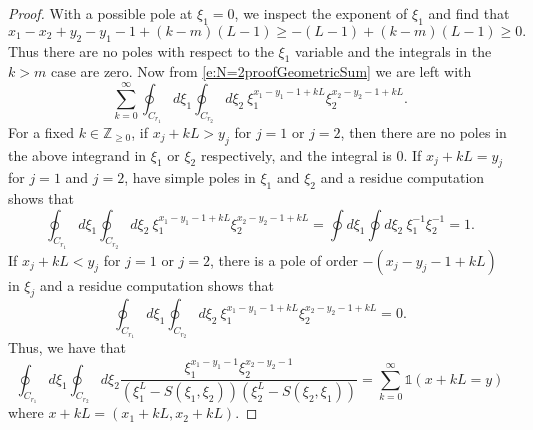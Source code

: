 \documentclass[10pt,a4paper]{amsart}
\begin{document}
\begin{proof}
With a possible pole at $\xi_1=0$, we inspect the exponent of $\xi_1$ and find that 
\begin{equation}
    x_1-x_2+y_2-y_1-1+(k-m)(L-1)\geq -(L-1)+(k-m)(L-1)\geq0.
\end{equation}
Thus there are no poles with respect to the $\xi_1$ variable and the integrals in the $k>m$ case are zero. Now from \eqref{e:N=2proofGeometricSum} we are left with 
\begin{equation}
    \sum_{k=0}^{\infty}\oint_{C_{r_1}} d\xi_1\oint_{C_{r_2}} d\xi_2 \ \xi_1^{x_1-y_1-1+kL}\xi_2^{x_2-y_2-1+kL}.
\end{equation}
For a fixed $k\in\mathbb{Z}_{\geq 0}$, if $x_j+kL>y_j$ for $j=1$ or $j=2$, then there are no poles in the above integrand in $\xi_1$ or $\xi_2$ respectively, and the integral is $0$. If $x_j+kL = y_j$ for $j=1$ and $j=2$, have simple poles in $\xi_1$ and $\xi_2$ and a residue computation shows that
\begin{equation}
    \oint_{C_{r_1}} d\xi_1\oint_{C_{r_2}} d\xi_2 \ \xi_1^{x_1-y_1-1+kL}\xi_2^{x_2-y_2-1+kL} = \oint d\xi_1\oint d\xi_2 \ \xi_1^{-1}\xi_2^{-1} =1.
\end{equation}
If $x_j+kL<y_j$ for $j=1$ or $j=2$, there is a pole of order $-(x_j-y_j-1+kL)$ in $\xi_j$ and a residue computation shows that
\begin{equation}
     \oint_{C_{r_1}} d\xi_1\oint_{C_{r_2}} d\xi_2 \ \xi_1^{x_1-y_1-1+kL}\xi_2^{x_2-y_2-1+kL} = 0.
\end{equation}
Thus, we have that 
\begin{equation}
    \oint_{C_{r_1}}d\xi_1\oint_{C_{r_2}}d\xi_2 \frac{\xi_1^{x_1-y_1-1}\xi_2^{x_2-y_2-1}}{\left(\xi_1^L - S(\xi_1,\xi_2) \right)\left(\xi_2^L - S(\xi_2,\xi_1) \right)} = \sum_{k=0}^\infty \mathds{1}(x+kL = y)
\end{equation}
where $x+kL = (x_1+kL, x_2+kL)$.


\end{proof}
\end{document}
